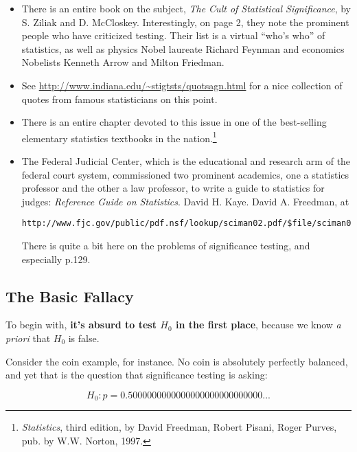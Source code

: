 \begin{itemize}

\item There is an entire book on the subject, {\it The Cult of
Statistical Significance}, by S. Ziliak and D. McCloskey.
Interestingly, on page 2, they note the prominent people who have
criticized testing.  Their list is a virtual ``who's who'' of
statistics, as well as physics Nobel laureate Richard Feynman and
economics Nobelists Kenneth Arrow and Milton Friedman. 

\item See \url{http://www.indiana.edu/~stigtsts/quotsagn.html} for a
nice collection of quotes from famous statisticians on this point.

\item There is an entire chapter devoted to this issue in one of the
best-selling elementary statistics textbooks in the
nation.\footnote{{\it Statistics}, third edition, by David Freedman,
Robert Pisani, Roger Purves, pub. by W.W.  Norton, 1997.} 

\item The Federal Judicial Center, which is the educational and research
arm of the federal court system, commissioned two prominent academics,
one a statistics professor and the other a law professor, to write a
guide to statistics for judges:  {\it Reference Guide on Statistics}.
David H.  Kaye. David A. Freedman, at
\begin{Verbatim}[fontsize=\relsize{-2}]
http://www.fjc.gov/public/pdf.nsf/lookup/sciman02.pdf/$file/sciman02.pdf
\end{Verbatim}

There is quite a bit here on the problems of significance testing, and
especially p.129.

\end{itemize}

\subsection{The Basic Fallacy}

To begin with, {\bf it's absurd to test $H_0$ in the first place},
because we know {\it a priori} that $H_0$ is false.  

Consider the coin example, for instance.  No coin is absolutely
perfectly balanced, and yet that is the question that significance
testing is asking:

\begin{equation}
H_0: p = 0.5000000000000000000000000000...  
\end{equation}

